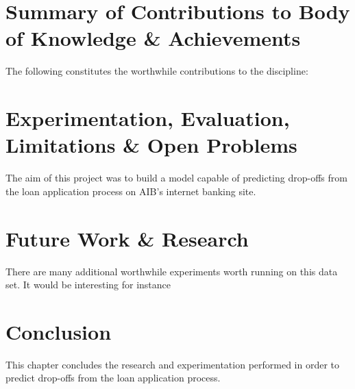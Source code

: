 \section{Summary of Contributions to Body of Knowledge \& Achievements}
The following constitutes the worthwhile contributions to the discipline:


\section{Experimentation, Evaluation, Limitations \& Open Problems}
The aim of this project was to build a model capable of predicting drop-offs from the loan application process on AIB's internet banking site.


\section{Future Work \& Research}
There are many additional worthwhile experiments worth running on this data set. It would be interesting for instance



\section{Conclusion}
This chapter concludes the research and experimentation performed in order to predict drop-offs from the loan application process. 

